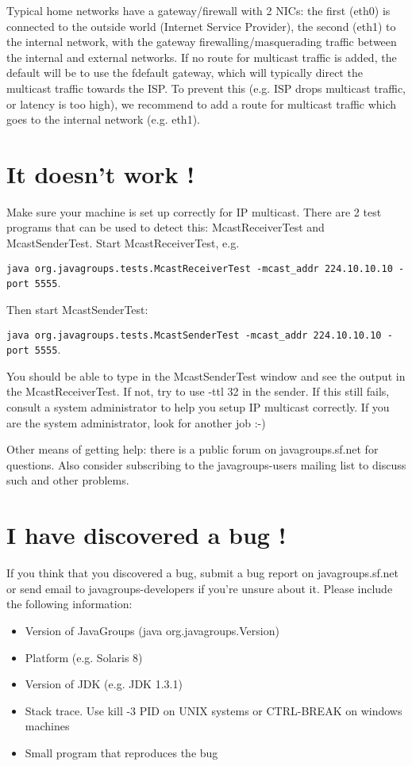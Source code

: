   Typical home networks have a gateway/firewall with 2 NICs: the first (eth0) is
  connected to the outside world (Internet Service Provider), the second (eth1) to
  the internal network, with the gateway firewalling/masquerading traffic between the
  internal and external networks. If no route for multicast traffic is added, the
  default will be to use the fdefault gateway, which will typically direct the
  multicast traffic towards the ISP. To prevent this (e.g. ISP drops multicast
  traffic, or latency is too high), we recommend to add a route for multicast traffic
  which goes to the internal network (e.g. eth1).


  \section{It doesn't work !} \label{ItDoesntWork}

  Make sure your machine is set up correctly for IP multicast. There are 2 test
  programs that can be used to detect this: McastReceiverTest and
  McastSenderTest. Start McastReceiverTest, e.g.

  {\tt java org.javagroups.tests.McastReceiverTest -mcast\_addr 224.10.10.10 -port 5555}.

  Then start McastSenderTest: 

  {\tt java org.javagroups.tests.McastSenderTest -mcast\_addr 224.10.10.10 -port 5555}.

  You should be able to type in the McastSenderTest window and see the output in the
  McastReceiverTest. If not, try to use -ttl 32 in the sender. If this still fails,
  consult a system administrator to help you setup IP multicast correctly. If you are
  the system administrator, look for another job :-)

  Other means of getting help: there is a public forum on javagroups.sf.net for
  questions. Also consider subscribing to the javagroups-users mailing list to
  discuss such and other problems.


  \section{I have discovered a bug !}

  If you think that you discovered a bug, submit a bug report on javagroups.sf.net or
  send email to javagroups-developers if you're unsure about it. Please include the
  following information:

  \begin{itemize}
  \item Version of JavaGroups (java org.javagroups.Version) 
  \item Platform (e.g. Solaris 8) 
  \item Version of JDK (e.g. JDK 1.3.1) 
  \item Stack trace. Use kill -3 PID on UNIX systems or CTRL-BREAK on windows machines 
  \item Small program that reproduces the bug 
  \end{itemize}


  